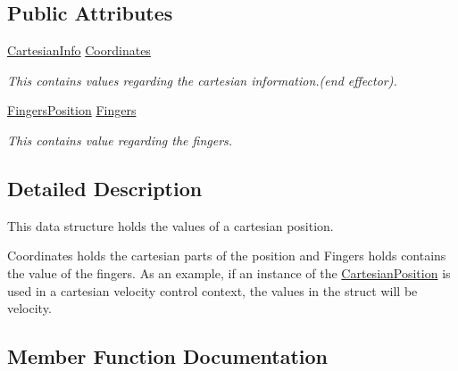 \subsection*{Public Attributes}
\begin{DoxyCompactItemize}
\item 
\hyperlink{structCartesianInfo}{Cartesian\+Info} \hyperlink{structCartesianPosition_aa1e120e383c650f4c4bf88ba8c780ab1}{Coordinates}
\begin{DoxyCompactList}\small\item\em This contains values regarding the cartesian information.(end effector). \end{DoxyCompactList}\item 
\hyperlink{structFingersPosition}{Fingers\+Position} \hyperlink{structCartesianPosition_ad0d8710c54bb2f63dfc98d809eaeb3a4}{Fingers}
\begin{DoxyCompactList}\small\item\em This contains value regarding the fingers. \end{DoxyCompactList}\end{DoxyCompactItemize}


\subsection{Detailed Description}
This data structure holds the values of a cartesian position. 

Coordinates holds the cartesian parts of the position and Fingers holds contains the value of the fingers. As an example, if an instance of the \hyperlink{structCartesianPosition}{Cartesian\+Position} is used in a cartesian velocity control context, the values in the struct will be velocity. 

\subsection{Member Function Documentation}
